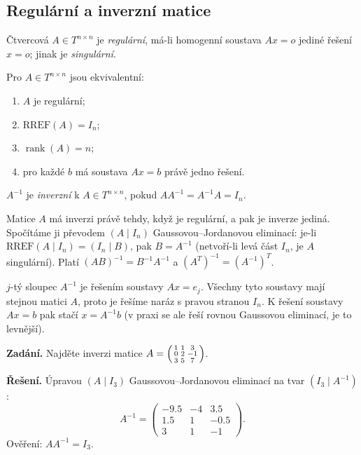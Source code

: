 \documentclass[11pt,a4paper]{article}
\newcommand{\rank}{\operatorname{rank}}
\begin{document}
\subsection{Regulární a inverzní matice}

\begin{definice}
Čtvercová $A\in T^{n\times n}$ je \emph{regulární}, má-li homogenní soustava $Ax=o$ jediné řešení $x=o$; jinak je \emph{singulární}.
\end{definice}

\begin{veta}
Pro $A\in T^{n\times n}$ jsou ekvivalentní:
\begin{enumerate}[label=(\arabic*)]
  \item $A$ je regulární;
  \item $\mathrm{RREF}(A)=I_n$;
  \item $\rank(A)=n$;
  \item pro každé $b$ má soustava $Ax=b$ právě jedno řešení.
\end{enumerate}
\end{veta}

\begin{definice}
$A^{-1}$ je \emph{inverzní} k $A\in T^{n\times n}$, pokud $AA^{-1}=A^{-1}A=I_n$.
\end{definice}

\begin{veta}
Matice $A$ má inverzi právě tehdy, když je regulární, a pak je inverze jediná. Spočítáme ji převodem $(A\mid I_n)$ Gaussovou--Jordanovou eliminací: je-li $\mathrm{RREF}(A\mid I_n)=(I_n\mid B)$, pak $B=A^{-1}$ (netvoří-li levá část $I_n$, je $A$ singulární). Platí $(AB)^{-1}=B^{-1}A^{-1}$ a $(A^T)^{-1}=(A^{-1})^T$.
\end{veta}

\begin{intuice}
$j$-tý sloupec $A^{-1}$ je řešením soustavy $Ax=e_j$. Všechny tyto soustavy mají stejnou matici $A$, proto je řešíme naráz s pravou stranou $I_n$. K řešení soustavy $Ax=b$ pak stačí $x=A^{-1}b$ (v praxi se ale řeší rovnou Gaussovou eliminací, je to levnější).
\end{intuice}

\begin{priklad}
\textbf{Zadání.} Najděte inverzi matice $A=\begin{psmallmatrix}1&1&3\\0&2&-1\\3&5&7\end{psmallmatrix}$.\par
\textbf{Řešení.} Úpravou $(A\mid I_3)$ Gaussovou--Jordanovou eliminací na tvar $(I_3\mid A^{-1})$:
\[
  A^{-1}=\begin{pmatrix}-9.5&-4&3.5\\ 1.5&1&-0.5\\ 3&1&-1\end{pmatrix}.
\]
Ověření: $AA^{-1}=I_3$.
\end{priklad}
\end{document}
